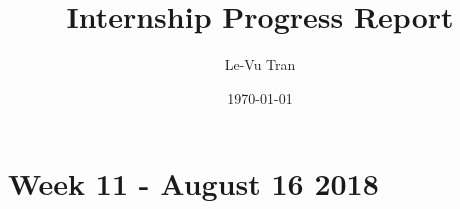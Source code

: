 \documentclass[a4paper]{report}
\title{Internship Progress Report}
\author{Le-Vu Tran}
\date{\today}
\begin{document}
\maketitle

\tableofcontents

\iffalse
\chapter{Week 1 - June 7, 2018}


\chapter{Week 2 - June 12, 2018}


\chapter{Week 3 - June 19, 2018}


\chapter{Week 4 - June 26, 2018}


\chapter{Week 5 - July 5 2018}


\chapter{Week 6 - July 12 2018}


\chapter{Week 7 - July 19 2018}


\chapter{Week 8 - July 26 2018}


\chapter{Week 9 - August 2 2018}


\chapter{Week 10 - August 9 2018}

\fi
\chapter{Week 11 - August 16 2018}



\end{document}
